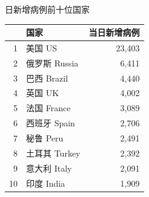\documentclass[]{article}
\begin{document}
\begin{table}[H]

    \begin{minipage}{.4\linewidth}
    \centering
    \captionsetup{justification=centering}
    \caption{日新增病例前十位国家}
    \vspace{-0.5\baselineskip}
      \centering
    \captionsetup{justification=centering} \begin{table}[H]
\centering\begingroup\fontsize{12}{14}\selectfont

\begin{tabular}{rlr}
\toprule
  & 国家 & 当日新增病例\\
\midrule
\rowcolor{gray!6}  1 & 美国 US & 23,403\\
2 & 俄罗斯 Russia & 6,411\\
\rowcolor{gray!6}  3 & 巴西 Brazil & 4,440\\
4 & 英国 UK & 4,002\\
\rowcolor{gray!6}  5 & 法国 France & 3,089\\
6 & 西班牙 Spain & 2,706\\
\rowcolor{gray!6}  7 & 秘鲁 Peru & 2,491\\
8 & 土耳其 Turkey & 2,392\\
\rowcolor{gray!6}  9 & 意大利 Italy & 2,091\\
10 & 印度 India & 1,909\\
\bottomrule
\end{tabular}
\endgroup{}
\end{table} \end{minipage}
    \begin{minipage}{.6\linewidth}
    \centering
    \captionsetup{justification=centering}
     \caption{累计死亡病例前十位国家}
     \vspace{-0.5\baselineskip}
      \centering
    \captionsetup{justification=centering} \begin{table}[H]
\centering\begingroup\fontsize{12}{14}\selectfont


\end{table}
\end{minipage}
\end{table}
\end{document}
